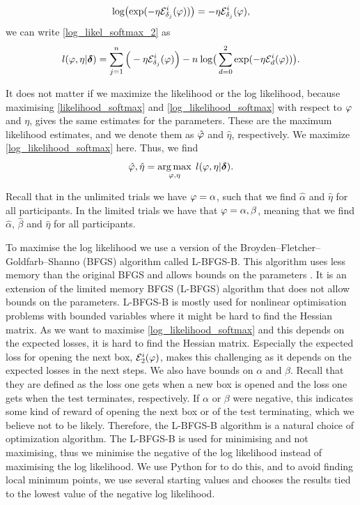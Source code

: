 \begin{equation*}
    \text{log} \big( \text{exp}(- \eta \mathcal{E}^i_{\delta_{j}}(\varphi))\big)
    = - \eta \mathcal{E}^i_{\delta_{j}}(\varphi),
\end{equation*}
we can write \eqref{log_likel_softmax_2} as
\begin{equation}
\label{log_likelihood_softmax}
    \begin{aligned}
       l(\varphi,\eta|\boldsymbol{\delta})
       = \sum_{j=1}^n \Big( - \eta \mathcal{E}^i_{\delta_{j}}(\varphi) \Big)
       - n \: \text{log} \big( \sum_{d=0}^{2} \text{exp}(-\eta \mathcal{E}^i_{d}(\varphi)) \big).
    \end{aligned}
\end{equation}

It does not matter if we maximize the likelihood or the log likelihood, because maximising \eqref{likelihood_softmax} and \eqref{log_likelihood_softmax} with respect to $\varphi$ and $\eta$, gives the same estimates for the parameters. These are the maximum likelihood estimates, and we denote them as $\hat{\varphi}$ and $\hat{\eta}$, respectively. We maximize \eqref{log_likelihood_softmax} here. Thus, we find
\begin{equation}
    \hat{\varphi},\hat{\eta} = \underset{\varphi,\eta}{\mathrm{arg}\,\mathrm{max}}\:\: l(\varphi,\eta|\boldsymbol{\delta}) .
\end{equation}

Recall that in the unlimited trials we have $\varphi=\alpha$, such that we find $\hat{\alpha}$ and $\hat{\eta}$ for all participants. In the limited trials we have that $\varphi=\alpha,\beta$, meaning that we find $\hat{\alpha}$, $\hat{\beta}$ and $\hat{\eta}$ for all participants.


To maximise the log likelihood we use a version of the Broyden–Fletcher– Goldfarb–Shanno (BFGS) algorithm called L-BFGS-B. This algorithm uses less memory than the original BFGS and allows bounds on the parameters \citep{optimization2}. It is an extension of the limited memory BFGS (L-BFGS) algorithm that does not allow bounds on the parameters. L-BFGS-B is mostly used for nonlinear optimisation problems with bounded variables where it might be hard to find the Hessian matrix. 
As we want to maximise \eqref{log_likelihood_softmax} and this depends on the expected losses, it is hard to find the Hessian matrix. Especially the expected loss for opening the next box, $\mathcal{E}_2^i(\varphi)$, makes this challenging as it depends on the expected losses in the next steps. We also have bounds on $\alpha$ and $\beta$. Recall that they are defined as the loss one gets when a new box is opened and the loss one gets when the test terminates, respectively. If $\alpha$ or $\beta$ were negative, this indicates some kind of reward of opening the next box or of the test terminating, which we believe not to be likely. Therefore, the L-BFGS-B algorithm is a natural choice of optimization algorithm. The L-BFGS-B is used for minimising and not maximising, thus we minimise the negative of the log likelihood instead of maximising the log likelihood. We use Python for to do this, and to avoid finding local minimum points, we use several starting values and chooses the results tied to the lowest value of the negative log likelihood. 

